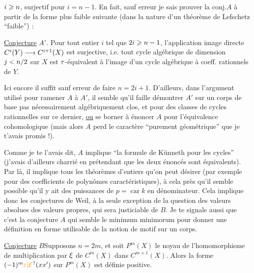 $i\geqslant n$, surjectif pour $i=n-1$. En fait, sauf erreur je sais prouver la conj.$A$ à partir de la forme plus faible suivante (dans la nature d'un théorème de Lefschetz ``faible'') :

\uline{Conjecture} $A'$. Pour tout entier $i$ tel que $2i\geqslant n-1$, l'application image directe $C^i(Y)\longrightarrow C^{i+1}(X)$ est surjective, i.e. tout cycle algébrique de dimension $j<n/2$ sur $X$ est $\tau$-équivalent à l'image d'un cycle algébrique à coeff. rationnels de $Y$.

Ici encore il suffit sauf erreur de faire $n=2i+1$. D'ailleurs, dans l'argument utilisé pour ramener $A$ à $A'$, il semble qu'il faille démontrer $A'$ sur un corps de base pas nécessairement algébriquement clos, et pour des classes de cycles rationnelles sur ce dernier, \uline{ou} se borner à énoncer $A$ pour l'équivalence cohomologique (mais alors $A$ perd le caractère ``purement géométrique'' que je t'avais promis !).

Comme je te l'avais dit, $A$ implique ``la formule de Künneth pour les cycles'' (j'avais d'ailleurs charrié en prétendant que les deux énoncés sont équivalents). Par là, il implique tous les théorèmes d'entiers qu'on peut désirer (par exemple pour des coefficients de polynômes caractéristiques), à cela près qu'il semble possible qu'il y ait des puissances de $p=\operatorname{car} k$ en dénominateur. Cela implique donc les conjectures de Weil, à la seule exception de la question des valeurs absolues des valeurs propres, qui sera justiciable de $B$. Je te signale aussi que c'est la conjecture $A$ qui semble le minimum minimorum pour donner une définition en forme utilisable de la notion de motif sur un corps.

\uline{Conjecture} $B$\quad Supposons $n=2m$, et soit $P^m(X)$ le noyau de l'homomorphisme de multiplication par $\xi$ de $C^m(X)$ dans $C^{m+1}(X)$. Alors la forme $(-1)^m\handwritten{\unsure{\varepsilon|\mathcal{E}}}(xx')$ sur $P^m(X)$ est définie positive.

